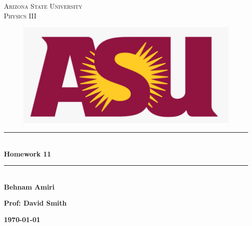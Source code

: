 \documentclass[fleqn]{article}
\begin{document}
  \begin{titlepage}

    \newcommand{\HRule}{\rule{\linewidth}{0.5mm}} %

    \center %
    


    \textsc{\LARGE Arizona State University}\\[1.5cm] %

    \textsc{\LARGE Physics III }\\[1.5cm] %


    \begin{figure}
      \includegraphics[width=\linewidth]{asu.png}
    \end{figure}


    \HRule \\[0.4cm]
    { \huge \bfseries Homework 11}\\[0.4cm] 
    \HRule \\[1.5cm]
    
    \textbf{Behnam Amiri}

    \bigbreak

    \textbf{Prof: David Smith}

    \bigbreak


    \textbf{{\large \today}\\[2cm]}

    \vfill %

  \end{titlepage}
\end{document}
